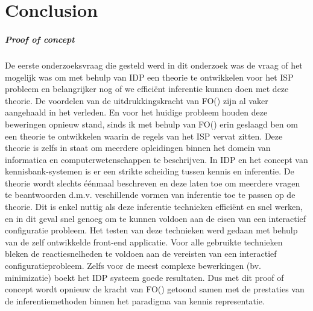 \chapter{Conclusion}
\label{cha:conclusion}
\paragraph{Proof of concept}
De eerste onderzoeksvraag die gesteld werd in dit onderzoek was de vraag of het mogelijk was om met behulp van IDP een theorie te ontwikkelen voor het ISP probleem en belangrijker nog of we effici\"{e}nt inferentie kunnen doen met deze theorie. De voordelen van de uitdrukkingskracht van FO(\textperiodcentered) zijn al vaker aangehaald \cite{van2016kb} \cite{de2014predicate} in het verleden. En voor het huidige probleem houden deze beweringen opnieuw stand, sinds ik met behulp van FO(\textperiodcentered) erin geslaagd ben om een theorie te ontwikkelen waarin de regels van het ISP vervat zitten. Deze theorie is zelfs in staat om meerdere opleidingen binnen het domein van informatica en computerwetenschappen te beschrijven. 
In IDP en het concept van kennisbank-systemen is er een strikte scheiding tussen kennis en inferentie. De theorie wordt slechts \'{e}\'{e}nmaal beschreven en deze laten toe om meerdere vragen te beantwoorden d.m.v. veschillende vormen van inferentie toe te passen op de theorie. Dit is enkel nuttig als deze inferentie technieken effici\"{e}nt en snel werken, en in dit geval snel genoeg om te kunnen voldoen aan de eisen van een interactief configuratie probleem. Het testen van deze technieken werd gedaan met behulp van de zelf ontwikkelde front-end applicatie. Voor alle gebruikte technieken bleken de reactiesnelheden te voldoen aan de vereisten van een interactief configuratieprobleem. Zelfs voor de meest complexe bewerkingen (bv. minimizatie) boekt het IDP systeem goede resultaten. Dus met dit proof of concept wordt opnieuw de kracht van FO(\textperiodcentered) getoond samen met de prestaties van de inferentiemethoden binnen het paradigma van kennis representatie.

